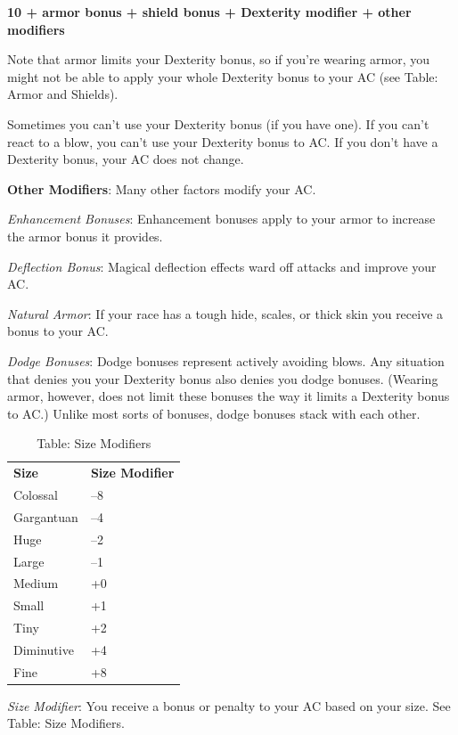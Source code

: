 {\large \textbf{10 + armor bonus + shield bonus + Dexterity modifier + other modifiers}}
				
Note that armor limits your Dexterity bonus, so if you're wearing armor, you might not be able to apply your whole Dexterity bonus to your AC (see Table: Armor and Shields).
				
Sometimes you can't use your Dexterity bonus (if you have one). If you can't react to a blow, you can't use your Dexterity bonus to AC. If you don't have a Dexterity bonus, your AC does not change.
				
\textbf{Other Modifiers}: Many other factors modify your AC.
				
\textit{Enhancement Bonuses}: Enhancement bonuses apply to your armor to increase the armor bonus it provides.
				
\textit{Deflection Bonus}: Magical deflection effects ward off attacks and improve your AC.
				
\textit{Natural Armor}: If your race has a tough hide, scales, or thick skin you receive a bonus to your AC.
				
\textit{Dodge Bonuses}: Dodge bonuses represent actively avoiding blows. Any situation that denies you your Dexterity bonus also denies you dodge bonuses. (Wearing armor, however, does not limit these bonuses the way it limits a Dexterity bonus to AC.) Unlike most sorts of bonuses, dodge bonuses stack with each other.
\begin{table}[]
\sffamily
\caption{Table: Size Modifiers}
\begin{tabular}{ll}
\textbf{Size} & \textbf{Size Modifier}\\
Colossal & --8 \\
 Gargantuan & --4 \\
 Huge & --2 \\
 Large & --1 \\
 Medium & +0 \\
 Small & +1 \\
 Tiny & +2 \\
 Diminutive & +4 \\
 Fine & +8\\
\end{tabular}
\end{table}

				
\textit{Size Modifier}: You receive a bonus or penalty to your AC based on your size. See Table: Size Modifiers.
				
